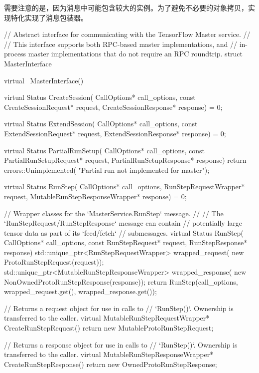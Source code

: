 \begin{content}
需要注意的是，因为消息中可能包含较大的实例。为了避免不必要的对象拷贝，实现特化实现了消息包装器。

\begin{leftbar}
\begin{c++}
// Abstract interface for communicating with the TensorFlow Master service.
//
// This interface supports both RPC-based master implementations, and
// in-process master implementations that do not require an RPC roundtrip.
struct MasterInterface {
  virtual ~MasterInterface() {}
  
  virtual Status CreateSession(
      CallOptions* call_options,
      const CreateSessionRequest* request,
      CreateSessionResponse* response) = 0;

  virtual Status ExtendSession(
      CallOptions* call_options,
      const ExtendSessionRequest* request,
      ExtendSessionResponse* response) = 0;

  virtual Status PartialRunSetup(
      CallOptions* call_options,
      const PartialRunSetupRequest* request,
      PartialRunSetupResponse* response) {
    return errors::Unimplemented(
      "Partial run not implemented for master");
  }

  virtual Status RunStep(
      CallOptions* call_options,
      RunStepRequestWrapper* request,
      MutableRunStepResponseWrapper* response) = 0;

  // Wrapper classes for the `MasterService.RunStep` message.
  //
  // The `RunStepRequest/RunStepResponse` message can contain 
  // potentially large tensor data as part of its `feed/fetch` 
  // submessages.
  virtual Status RunStep(
    CallOptions* call_options,
    const RunStepRequest* request,
    RunStepResponse* response) {
    std::unique_ptr<RunStepRequestWrapper> wrapped_request(
        new ProtoRunStepRequest(request));
    std::unique_ptr<MutableRunStepResponseWrapper> wrapped_response(
        new NonOwnedProtoRunStepResponse(response));
    return RunStep(call_options, 
        wrapped_request.get(), 
        wrapped_response.get());
  }

  // Returns a request object for use in calls to
  // `RunStep()`. Ownership is transferred to the caller.
  virtual MutableRunStepRequestWrapper* CreateRunStepRequest() {
    return new MutableProtoRunStepRequest;
  }

  // Returns a response object for use in calls to
  // `RunStep()`. Ownership is transferred to the caller.
  virtual MutableRunStepResponseWrapper* CreateRunStepResponse() {
    return new OwnedProtoRunStepResponse;
  }

}
\end{c++}
\end{leftbar}
\end{content}
